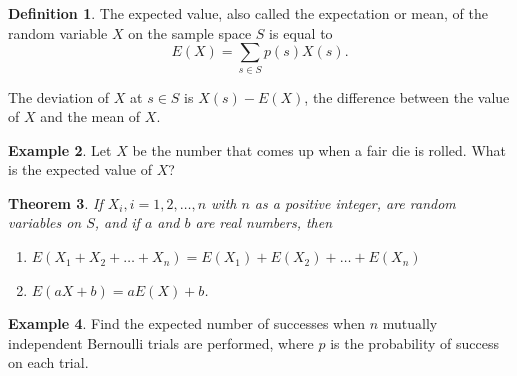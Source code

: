 \documentclass[letterpaper,10pt]{article}
\theoremstyle{plain}
\newtheorem{thm}{Theorem}[section]
\theoremstyle{definition}
\newtheorem{defn}[thm]{Definition}
\newtheorem{exmp}[thm]{Example}
\theoremstyle{remark}
\begin{document}
\begin{defn}
The expected value, also called the expectation or mean, of the random variable \(X\) on the sample space \(S\) is equal to
\[ E(X) = \sum_{s \in S} p(s)X(s). \]

The deviation of \(X\) at \(s \in S\) is \(X(s) - E(X)\), the difference between the value of \(X\) and the mean of \(X\).

\end{defn}
\begin{exmp}
Let $X$ be the number that comes up when a fair die is rolled. What
is the expected value of $X$?
\vspace{3cm}
\end{exmp}

\begin{thm}
If \(X_i, i = 1, 2, \ldots, n\) with \(n\) as a positive integer, are random variables on \(S\), and if \(a\) and \(b\) are real numbers, then
\begin{enumerate}
    \item \(E(X_1 + X_2 + \ldots + X_n) = E(X_1) + E(X_2) + \ldots + E(X_n)\)
    \item \(E(aX + b) = aE(X) + b\).
\end{enumerate}

\end{thm}
\begin{exmp}
Find the expected number of successes when $n$ mutually independent Bernoulli trials are performed,
where $p$ is the probability of success on each trial.
\end{exmp}
\end{document}
